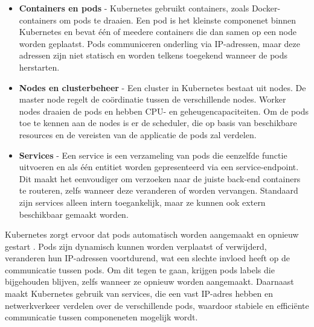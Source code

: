 \begin{itemize}
	\item \textbf{Containers en pods} - Kubernetes gebruikt containers, zoals Docker-containers om pods te draaien. Een pod is het kleinste componenet binnen Kubernetes en bevat één of meedere containers die dan samen op een node worden geplaatst. Pods communiceren onderling via IP-adressen, maar deze adressen zijn niet statisch en worden telkens toegekend wanneer de pods herstarten.
	\item \textbf{Nodes en clusterbeheer} - Een cluster in Kubernetes bestaat uit nodes. De master node regelt de coördinatie tussen de verschillende nodes. Worker nodes draaien de pods en hebben CPU- en geheugencapaciteiten. Om de pods toe te kennen aan de nodes is er de scheduler, die op basis van beschikbare resources en de vereisten van de applicatie de pods zal verdelen.
	\item \textbf{Services} - Een service is een verzameling van pods die eenzelfde functie uitvoeren en als één entitiet worden gepresenteerd via een service-endpoint. Dit maakt het eenvoudiger om verzoeken naar de juiste back-end containers te routeren, zelfs wanneer deze veranderen of worden vervangen. Standaard zijn services alleen intern toegankelijk, maar ze kunnen ook extern beschikbaar gemaakt worden.
\end{itemize}

Kubernetes zorgt ervoor dat pods automatisch worden aangemaakt en opnieuw gestart \autocite{Vayghan2021}. Pods zijn dynamisch kunnen worden verplaatst of verwijderd, veranderen hun IP-adressen voortdurend, wat een slechte invloed heeft op de communicatie tussen pods. Om dit tegen te gaan, krijgen pods labels die bijgehouden blijven, zelfs wanneer ze opnieuw worden aangemaakt. Daarnaast maakt Kubernetes gebruik van services, die een vast IP-adres hebben en netwerkverkeer verdelen over de verschillende pods, waardoor stabiele en efficiënte communicatie tussen componeneten mogelijk wordt.




